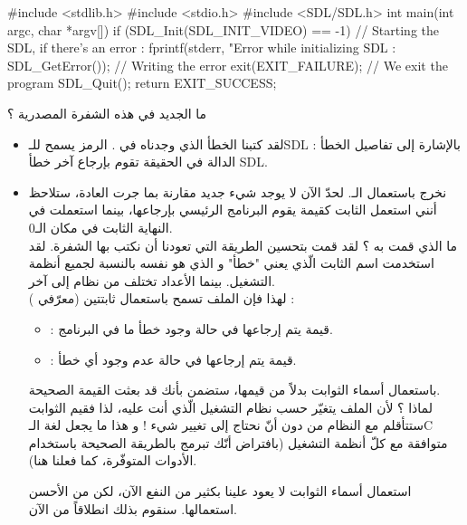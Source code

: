 \begin{Csource}
#include <stdlib.h>
#include <stdio.h>
#include <SDL/SDL.h>
int main(int argc, char *argv[])
{
	if (SDL_Init(SDL_INIT_VIDEO) == -1) // Starting the SDL, if there's an error :
	{
		fprintf(stderr, "Error while initializing SDL : %
		SDL_GetError()); // Writing the error
		exit(EXIT_FAILURE); // We exit the program
	}
	SDL_Quit();
	return EXIT_SUCCESS;
}
\end{Csource}

ما الجديد في هذه الشفرة المصدرية ؟

\begin{itemize}
	\item لقد كتبنا الخطأ الذي وجدناه في
	.
	الرمز 
	يسمح للـ\textenglish{SDL} 
	بالإشارة إلى تفاصيل الخطأ : الدالة 
	في الحقيقة تقوم بإرجاع آخر خطأ
	\textenglish{SDL}.
	\item نخرج باستعمال الـ.
	لحدّ الآن لا يوجد شيء جديد مقارنة بما جرت العادة، ستلاحظ أنني استعمل الثابت 
	كقيمة يقوم البرنامج الرئيسي بإرجاعها، بينما استعملت في النهاية الثابت 
	في مكان الـ0.\\
	ما الذي قمت به ؟ لقد قمت بتحسين الطريقة التي تعودنا أن نكتب بها الشفرة. لقد استخدمت اسم الثابت الّذي يعني "خطأ" و الذي هو نفسه بالنسبة لجميع أنظمة التشغيل. بينما الأعداد تختلف من نظام إلى آخر.\\
	لهذا فإن الملف
	تسمح باستعمال ثابتتين (معرّفي 
	) :
	
	\begin{itemize}
		\item {} :
		قيمة يتم إرجاعها في حالة وجود خطأ ما في البرنامج.
		\item {} :
		قيمة يتم إرجاعها في حالة عدم وجود أي خطأ.
	\end{itemize}
	
	باستعمال أسماء الثوابت بدلاً من قيمها، ستضمن بأنك قد بعثت القيمة الصحيحة.\\
	لماذا ؟ لأن الملف
	يتغيّر حسب نظام التشغيل الّذي أنت عليه، لذا فقيم الثوابت ستتأقلم مع النظام من دون أنّ نحتاج إلى تغيير شيء !  و هذا ما يجعل لغة الـ\textenglish{C}
	متوافقة مع كلّ أنظمة التشغيل (بافتراض أنّك تبرمج بالطريقة الصحيحة باستخدام الأدوات المتوفّرة، كما فعلنا هنا).

\begin{information}
	استعمال أسماء الثوابت لا يعود علينا بكثير من النفع الآن، لكن من الأحسن استعمالها. سنقوم بذلك انطلاقاً من الآن.
\end{information}
\end{itemize}

